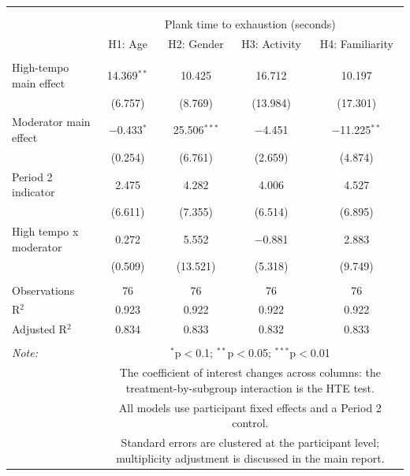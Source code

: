 
\begingroup 
\tiny 
\begin{tabular}{@{\extracolsep{1pt}}lcccc} 
\\[-1.8ex]\hline 
\hline \\[-1.8ex] 
\\[-1.8ex] & \multicolumn{4}{c}{Plank time to exhaustion (seconds)} \\ 
 & H1: Age & H2: Gender & H3: Activity & H4: Familiarity \\ 
\hline \\[-1.8ex] 
 High-tempo main effect & 14.369$^{**}$ & 10.425 & 16.712 & 10.197 \\ 
  & (6.757) & (8.769) & (13.984) & (17.301) \\ 
  Moderator main effect & $-$0.433$^{*}$ & 25.506$^{***}$ & $-$4.451 & $-$11.225$^{**}$ \\ 
  & (0.254) & (6.761) & (2.659) & (4.874) \\ 
  Period 2 indicator & 2.475 & 4.282 & 4.006 & 4.527 \\ 
  & (6.611) & (7.355) & (6.514) & (6.895) \\ 
  High tempo x moderator & 0.272 & 5.552 & $-$0.881 & 2.883 \\ 
  & (0.509) & (13.521) & (5.318) & (9.749) \\ 
 \hline \\[-1.8ex] 
Observations & 76 & 76 & 76 & 76 \\ 
R$^{2}$ & 0.923 & 0.922 & 0.922 & 0.922 \\ 
Adjusted R$^{2}$ & 0.834 & 0.833 & 0.832 & 0.833 \\ 
\hline 
\hline \\[-1.8ex] 
\textit{Note:}  & \multicolumn{4}{p{0.78\textwidth}}{$^{*}$p$<$0.1; $^{**}$p$<$0.05; $^{***}$p$<$0.01} \\ 
 & \multicolumn{4}{p{0.78\textwidth}}{The coefficient of interest changes across columns: the treatment-by-subgroup interaction is the HTE test.} \\ 
 & \multicolumn{4}{p{0.78\textwidth}}{All models use participant fixed effects and a Period 2 control.} \\ 
 & \multicolumn{4}{p{0.78\textwidth}}{Standard errors are clustered at the participant level; multiplicity adjustment is discussed in the main report.} \\ 
\end{tabular} 
\endgroup 
